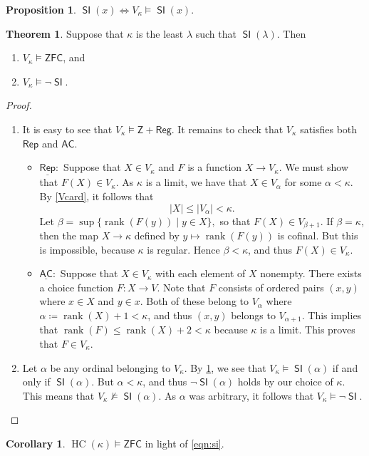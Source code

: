 \documentclass[10pt,letterpaper,cm]{nupset}
\theoremstyle{definition}
\theoremstyle{theorem}
\newtheorem{theorem}[definition]{Theorem}
\newtheorem{prop}[definition]{Proposition}
\newtheorem{corollary}[definition]{Corollary}
\theoremstyle{remark}
\newcommand{\1}{\mathbf{1}}
\newcommand{\0}{\vec 0}
\newcommand{\z}{\mathsf{Z}}
\newcommand{\zfc}{\mathsf{ZFC}}
\newcommand{\ac}{\mathsf{AC}}
\DeclareMathOperator{\si}{\mathsf{SI}}
\DeclareMathOperator{\rnk}{rank}
\DeclareMathOperator{\hc}{HC}
\newcommand{\bi}{\begin{itemize}}
\newcommand{\ei}{\end{itemize}}
\newcommand{\be}{\begin{enumerate}}
\newcommand{\ee}{\end{enumerate}}
\begin{document}
\begin{prop}\label{abssi}
$\si(x) \iff V_{\kappa} \models \si(x)$.
\end{prop}

\begin{theorem}\label{sin}
Suppose that $\kappa$ is the least $\lambda$ such that $\si(\lambda)$. Then
\be[label=(\alph*)]
\item $V_{\kappa} \models \zfc$, and 
\item $V_{\kappa} \models \neg{\si}$.
\ee
\end{theorem}
\begin{proof} $ $
\be[label=(\alph*)]
\item It is easy to see that $V_{\kappa} \models \z + \mathsf{Reg}$. It remains to check that $V_{\kappa}$ satisfies both $\mathsf{Rep}$ and $\ac$.
\bi
\item $\underline{\mathsf{Rep}}:$  Suppose that $X\in V_{\kappa}$ and $F$ is a function $X \to V_{\kappa}$. We must show that $F(X) \in V_{\kappa}$. As $\kappa$ is a limit, we have that $X\in V_{\alpha}$ for some $\alpha < \kappa$. By \cref{Vcard}, it follows that $$\left\lvert{X}\right\rvert \leq \left\lvert{V_{\alpha}}\right\rvert < \kappa.$$ Let $\beta = \sup\{\rnk(F(y)) \mid y\in X\},$ so that $F(X)\in V_{\beta + 1}$. If $\beta = \kappa$, then the map $X \to \kappa$ defined by $y \mapsto \rnk(F(y))$ is cofinal. But this is impossible, because $\kappa$ is regular. Hence $\beta <\kappa$, and thus $F(X) \in V_{\kappa}$.

\item $\underline{\ac}:$ Suppose that $X\in V_{\kappa}$ with each element of $X$ nonempty. There exists a choice function $F: X \to V$. Note that $F$ consists of ordered pairs $\left(x,y\right)$ where $x\in X$ and $y\in x$. Both of these belong to $V_{\alpha}$ where $\alpha \coloneqq \rnk(X) +1<\kappa$, and thus $\left(x,y\right)$ belongs to  $V_{\alpha+1}$. This implies that $\rnk(F) \leq \rnk(X)+2 <\kappa$ because $\kappa$ is a limit. This proves that $F\in V_{\kappa}$.
\ei
\item Let $\alpha$ be any ordinal belonging to $V_{\kappa}$. By \cref{abssi}, we see that $V_{\kappa} \models \si(\alpha)$ if and only if $\si(\alpha)$. But $\alpha < \kappa$, and thus $\neg{\si(\alpha)}$ holds by our choice of $\kappa$. This means that $V_{\kappa} \not\models \si(\alpha)$. As $\alpha$ was arbitrary, it follows that $V_{\kappa}\models \neg{\si}$.
\ee
\end{proof}

\begin{corollary}
$\hc(\kappa) \models \zfc$ in light of \eqref{eqn:si}.
\end{corollary}
\end{document}

